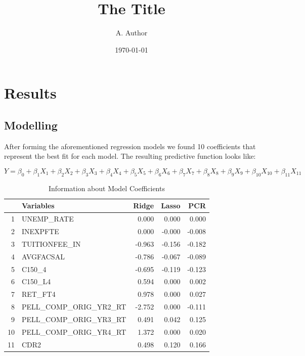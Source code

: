 \documentclass{article}
\begin{document}

\title{The Title}
\author{A. Author}
\date{\today}
\maketitle




\section{Results}

\subsection{Modelling}
After forming the aforementioned regression models we found 10 coefficients that represent the best fit for each model. The resulting predictive function looks like:

\begin{equation}
Y = \beta_0 + \beta_1 X_1 + \beta_2 X_2 + \beta_3 X_3 + \beta_4 X_4 + \beta_5 X_5 + \beta_6 X_6 + \beta_7 X_7 + \beta_8 X_8 + \beta_9 X_9 + \beta_{10} X_{10} + \beta_{11} X_{11}
\end{equation}


\begin{center}
\begin{table}[ht]
\centering
\caption{Information about Model Coefficients} 
\begin{tabular}{rlrrr}
  \hline
 & Variables & Ridge & Lasso & PCR \\ 
  \hline
1 & UNEMP\_RATE & 0.000 & 0.000 & 0.000 \\ 
  2 & INEXPFTE & 0.000 & -0.000 & -0.008 \\ 
  3 & TUITIONFEE\_IN & -0.963 & -0.156 & -0.182 \\ 
  4 & AVGFACSAL & -0.786 & -0.067 & -0.089 \\ 
  5 & C150\_4 & -0.695 & -0.119 & -0.123 \\ 
  6 & C150\_L4 & 0.594 & 0.000 & 0.002 \\ 
  7 & RET\_FT4 & 0.978 & 0.000 & 0.027 \\ 
  8 & PELL\_COMP\_ORIG\_YR2\_RT & -2.752 & 0.000 & -0.111 \\ 
  9 & PELL\_COMP\_ORIG\_YR3\_RT & 0.491 & 0.042 & 0.125 \\ 
  10 & PELL\_COMP\_ORIG\_YR4\_RT & 1.372 & 0.000 & 0.020 \\ 
  11 & CDR2 & 0.498 & 0.120 & 0.166 \\ 
   \hline
\end{tabular}
\end{table}\end{center}
\end{document}
